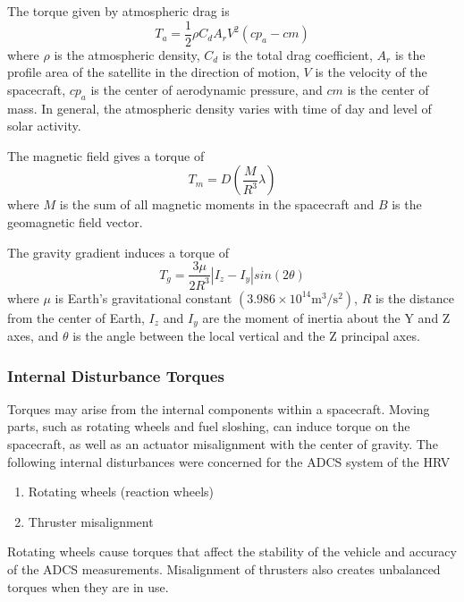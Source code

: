 \documentclass[paper=letter, fontsize=11pt]{scrartcl} %
\numberwithin{equation}{section} %
\numberwithin{figure}{section} %
\numberwithin{table}{section} %
\begin{document}
\bigskip \noindent The torque given by atmospheric drag is
\begin{equation*}
T_a = \frac{1}{2}\rho C_d A_r V^{2}(cp_a - cm)
\label{equation:ta}
\end{equation*}
where $\rho$ is the atmospheric density, $C_d$ is the total drag coefficient, $A_r$ is the profile area of the satellite in the direction of motion, $V$ is the velocity of the spacecraft, $cp_a$ is the center of aerodynamic pressure, and $cm$ is the center of mass. In general, the atmospheric density varies with time of day and level of solar activity.

\noindent The magnetic field gives a torque of
\begin{equation*}
T_m = D\left(\frac{M}{R^{3}}\lambda\right)
\label{equation:tm}
\end{equation*}
where $M$ is the sum of all magnetic moments in the spacecraft and $B$ is the geomagnetic field vector.

\noindent The gravity gradient induces a torque of
\begin{equation*}
T_g = \frac{3\mu}{2R^{3}} | I_z - I_y | sin(2\theta)
\label{equation:tg}
\end{equation*}
where $\mu$ is Earth's gravitational constant $(3.986 \times 10^{14} \mathrm{m^{3}/s^{2}})$, $R$ is the distance from the center of Earth, $I_z$ and $I_y$ are the moment of inertia about the Y and Z axes, and $\theta$ is the angle between the local vertical and the Z principal axes.

\subsubsection{Internal Disturbance Torques}
Torques may arise from the internal components within a spacecraft. Moving parts, such as rotating wheels and fuel sloshing, can induce torque on the spacecraft, as well as an actuator misalignment with the center of gravity. The following internal disturbances were concerned for the ADCS system of the HRV

\begin{enumerate}
\item Rotating wheels (reaction wheels)
\item Thruster misalignment
\end{enumerate}

\bigskip
\par Rotating wheels cause torques that affect the stability of the vehicle and accuracy of the ADCS measurements. Misalignment of thrusters also creates unbalanced torques when they are in use.
\end{document}
